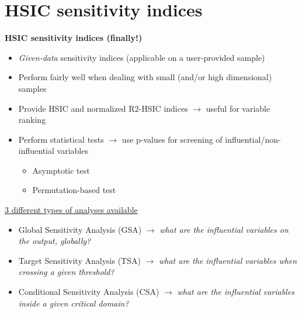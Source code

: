 \documentclass[aspectratio=169]{beamer}
\begin{document}
\section{HSIC sensitivity indices}


\begin{frame}
\begin{small}

\textbf{HSIC sensitivity indices (finally!)}

\begin{itemize}
\item \emph{Given-data} sensitivity indices (applicable on a user-provided sample)
\item Perform fairly well when dealing with small (and/or high dimensional) samples
\item Provide HSIC and normalized R2-HSIC indices $\rightarrow$ useful  for variable ranking
\item Perform statistical tests $\rightarrow$ use p-values for screening of influential/non-influential variables
\begin{itemize}
\item Asymptotic test
\item Permutation-based test
\end{itemize}
\end{itemize}

\vspace{12pt}

\underline{3 different types of analyses available}

\begin{itemize}
\item Global Sensitivity Analysis (GSA) $\rightarrow$ \emph{what are the influential variables on the output, globally?}
\item Target Sensitivity Analysis (TSA) $\rightarrow$ \emph{what are the influential variables when crossing a given threshold?}
\item Conditional Sensitivity Analysis (CSA) $\rightarrow$ \emph{what are the influential variables inside a given critical domain?}
\end{itemize}

\end{small}
\end{frame}
\end{document}
